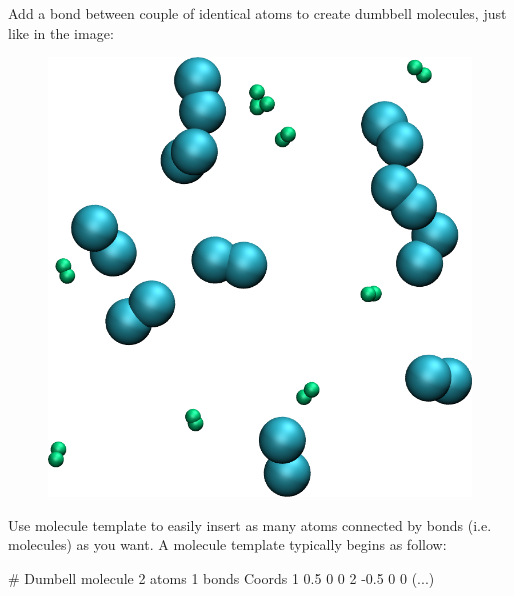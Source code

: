 Add a bond between couple of identical atoms to create
dumbbell molecules, just like in the image:

\begin{figure}
\includegraphics[width=\linewidth]{tutorials/level0/lennard-jones-fluid/dumbell-light.png}
\end{figure}

\begin{tcolorbox}[colback=mylightblue!5!white,colframe=mylightblue!75!black,title=Hints]
Use molecule template to easily insert as many atoms connected
by bonds (i.e. molecules) as you want. A molecule 
template typically begins as follow:
\begin{lcverbatim}
# Dumbell molecule
2 atoms
1 bonds
Coords
1 0.5 0 0
2 -0.5 0 0
(...)
\end{lcverbatim}

\noindent \end{tcolorbox}

